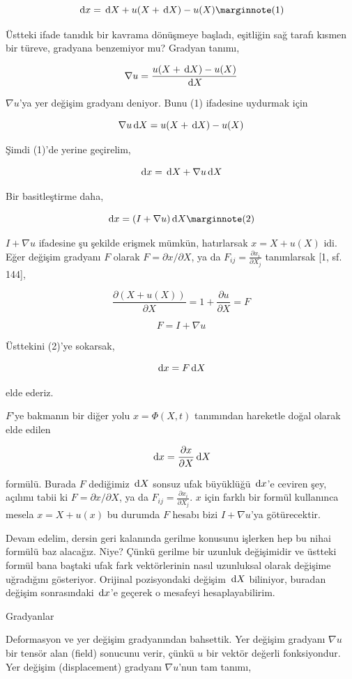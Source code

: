 \documentclass[12pt,fleqn]{article}\usepackage{../../common}
\begin{document}
$$
\ud x = \ud X + u(X+\ud X) - u(X)
\mlabel{1}
$$

Üstteki ifade tanıdık bir kavrama dönüşmeye başladı, eşitliğin sağ tarafı kısmen
bir türeve, gradyana benzemiyor mu? Gradyan tanımı,

$$
\nabla u = \frac{u(X+\,\mathrm{d} X) - u(X)}{\,\mathrm{d} X}
$$

$\nabla u$'ya yer değişim gradyanı deniyor.  Bunu (1) ifadesine uydurmak için 

$$
\nabla u \,\mathrm{d} X = u(X+\,\mathrm{d} X) - u(X)
$$


Şimdi (1)'de yerine geçirelim,

$$
\,\mathrm{d} x = \,\mathrm{d} X + \nabla u \,\mathrm{d} X
$$

Bir basitleştirme daha,

$$
\ud x = (I + \nabla u) \ud X
\mlabel{2}
$$

$I + \nabla u$ ifadesine şu şekilde erişmek mümkün, hatırlarsak
$x = X + u(X)$ idi. Eğer değişim gradyanı $F$ olarak $F = \partial x / \partial X$,
ya da $F_{ij} = \frac{\partial x_i}{\partial X_j}$ tanımlarsak [1, sf. 144], 

$$
\frac{\partial (X + u(X))}{\partial X} = 1  + \frac{\partial u}{\partial X} = F
$$

$$
F = I + \nabla u
$$

Üsttekini (2)'ye sokarsak,

$$
\,\mathrm{d} x = F \,\mathrm{d} X
$$

elde ederiz.

$F$'ye bakmanın bir diğer yolu $x = \Phi(X,t)$ tanımından hareketle doğal olarak
elde edilen

$$
\,\mathrm{d} x = \frac{\partial x}{\partial X} \,\mathrm{d} X
$$

formülü. Burada $F$ dediğimiz $\,\mathrm{d} X$ sonsuz ufak büyüklüğü $\,\mathrm{d} x$'e ceviren
şey, açılımı tabii ki $F = \partial x / \partial X$, ya da $F_{ij} = \frac{\partial x_i}{\partial X_j}$.
$x$ için farklı bir formül kullanınca mesela $x = X + u(x)$ bu durumda $F$
hesabı bizi $I + \nabla u$'ya götürecektir.

Devam edelim, dersin geri kalanında gerilme konusunu işlerken hep bu nihai
formülü baz alacağız. Niye?  Çünkü gerilme bir uzunluk değişimidir ve üstteki
formül bana baştaki ufak fark vektörlerinin nasıl uzunluksal olarak değişime
uğradığını gösteriyor. Orijinal pozisyondaki değişim $\,\mathrm{d} X$ biliniyor, buradan
değişim sonrasındaki $\,\mathrm{d} x$'e geçerek o mesafeyi hesaplayabilirim.


Gradyanlar

Deformasyon ve yer değişim gradyanından bahsettik. Yer değişim gradyanı $\nabla
u$ bir tensör alan (field) sonucunu verir, çünkü $u$ bir vektör değerli
fonksiyondur. Yer değişim (displacement) gradyanı $\nabla u$'nun tam tanımı,
\end{document}
